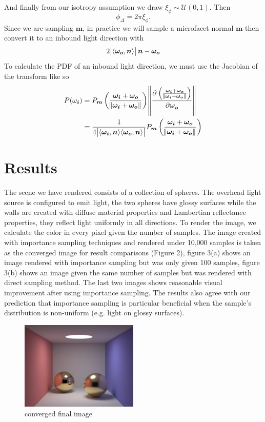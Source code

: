 \documentclass[12pt]{article}
\DeclarePairedDelimiter\ip{\langle }{\rangle}
\begin{document}
And finally from our isotropy assumption we draw \(\xi_\phi \sim \mathcal{U}(0, 1)\).
Then
\[\phi_\Delta = 2\pi\xi_\phi .\]
Since we are sampling \(\bm m\), in practice we will sample a microfacet normal \( \bm m\) then convert it to an inbound light direction with
\[2\abs{\ip{\bm{\omega_o}, \bm n}}\bm n-  \bm{\omega_o}\]
To calculate the PDF of an inbound light direction, we must use the Jacobian of the transform like so
\begin{align*}
  P(\omega_{\bm i}) &= P_{\bm m}\del{\frac{\bm{\omega_i} + \bm{\omega_o}}{\norm{\bm{\omega_i} + \bm{\omega_o}}} } \norm{\dpd{\del{\frac{\bm{\omega_i} + \bm{\omega_o}}{\norm{\bm{\omega_i} + \bm{\omega_o}}}}}{\bm{\omega_o}}}\\
   &= \frac{1}{4\abs{\ip{\bm{\omega_i}, \bm n}\ip{\bm{\omega_o}, \bm n}}}P_{\bm m}\del{\frac{\bm{\omega_i} + \bm{\omega_o}}{\norm{\bm{\omega_i} + \bm{\omega_o}}} }
\end{align*}
\section{Results}
The scene we have rendered consists of a collection of spheres. The overhead light source is configured to emit light, the two spheres have glossy surfaces while the walls are created with diffuse material properties and Lambertian reflectance properties, they reflect light uniformly in all directions. To render the image, we calculate the color in every pixel given the number of samples. The image created with importance sampling techniques and rendered under 10,000 samples is taken as the converged image for result comparisons (Figure 2), figure 3(a) shows an image rendered with importance sampling but was only given 100 samples, figure 3(b) shows an image given the same number of samples but was rendered with direct sampling method. The last two images shows reasonable visual improvement after using importance sampling. The results also agree with our prediction that importance sampling is particular beneficial when the sample's distribution is non-uniform (e.g. light on glossy surfaces).

\begin{figure}[ht]
  \centering
    \includegraphics[width=0.5\textwidth]{convergedIS.png}
    \caption{converged final image}
\end{figure}
\end{document}
